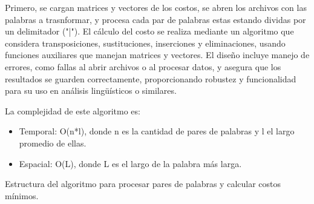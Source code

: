 Primero, se cargan matrices y vectores de los costos, se abren los archivos con las palabras a trasnformar, y procesa cada par de palabras estas estando dividas por un delimitador ("|"). El cálculo del costo se realiza mediante un algoritmo que considera transposiciones, sustituciones, inserciones y eliminaciones, usando funciones auxiliares que manejan matrices y vectores. El diseño incluye manejo de errores, como fallas al abrir archivos o al procesar datos, y asegura que los resultados se guarden correctamente, proporcionando robustez y funcionalidad para su uso en análisis lingüísticos o similares.


La complejidad de este algoritmo es:
\begin{itemize}
\item Temporal: O(n*l), donde n es la cantidad de pares de palabras y l el largo promedio de ellas.
\item Espacial: O(L), donde L es el largo de la palabra más larga.
\end{itemize}
\begin{algorithm}[H]

    \DontPrintSemicolon
    \footnotesize

    \caption{Estructura del algoritmo para procesar pares de palabras y calcular costos mínimos.}
    \label{alg:procesar_pares_palabras}
\end{algorithm}


